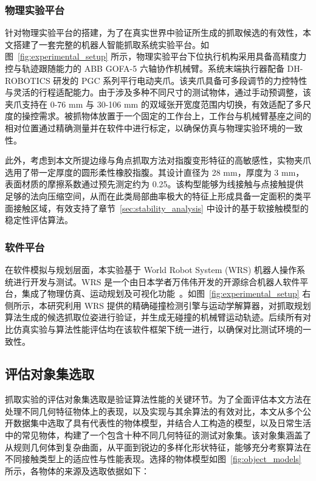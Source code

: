 \subsubsection{物理实验平台}
针对物理实验平台的搭建，为了在真实世界中验证所生成的抓取候选的有效性，本文搭建了一套完整的机器人智能抓取系统实验平台。如图~\ref{fig:experimental_setup} 所示，物理实验平台下位执行机构采用具备高精度力控与轨迹跟随能力的 ABB GOFA-5 六轴协作机械臂。系统末端执行器配备 DH-ROBOTICS 研发的 PGC 系列平行电动夹爪。该夹爪具备可多段调节的力控特性与灵活的行程适配能力。由于涉及多种不同尺寸的测试物体，通过手动预调整，该夹爪支持在 0-76 mm 与 30-106 mm 的双域张开宽度范围内切换，有效适配了多尺度的操控需求。被抓物体放置于一个固定的工作台上，工作台与机械臂基座之间的相对位置通过精确测量并在软件中进行标定，以确保仿真与物理实验环境的一致性。

此外，考虑到本文所提边缘与角点抓取方法对指腹变形特征的高敏感性，实物夹爪选用了带一定厚度的圆形柔性橡胶指腹。其设计直径为 28 mm，厚度为 3 mm，表面材质的摩擦系数通过预先测定约为 0.25。该构型能够为线接触与点接触提供足够的法向压缩空间，从而在此类局部曲率极大的特征上形成具备一定面积的类平面接触区域，有效支持了章节~\ref{sec:stability_analysis} 中设计的基于软接触模型的稳定性评估算法。

\subsubsection{软件平台}
在软件模拟与规划层面，本实验基于 World Robot System (WRS) 机器人操作系统进行开发与测试。WRS 是一个由日本学者万伟伟开发的开源综合机器人软件平台，集成了物理仿真、运动规划及可视化功能~\cite{wan_planning_2021}。如图~\ref{fig:experimental_setup} 右侧所示，本研究利用 WRS 提供的精确碰撞检测引擎与运动学解算器，对抓取规划算法生成的候选抓取位姿进行验证，并生成无碰撞的机械臂运动轨迹。后续所有对比仿真实验与算法性能评估均在该软件框架下统一进行，以确保对比测试环境的一致性。

\subsection{评估对象集选取}
抓取实验的评估对象集选取是验证算法性能的关键环节。为了全面评估本文方法在处理不同几何特征物体上的表现，以及实现与其余算法的有效对比，本文从多个公开数据集中选取了具有代表性的物体模型，并结合人工构造的模型，以及日常生活中的常见物体，构建了一个包含十种不同几何特征的测试对象集。该对象集涵盖了从规则几何体到复杂曲面，从平面到锐边的多样化形状特征，能够充分考察算法在不同接触类型上的适应性与性能表现。选择的物体模型如图~\ref{fig:object_models} 所示，各物体的来源及选取依据如下：

